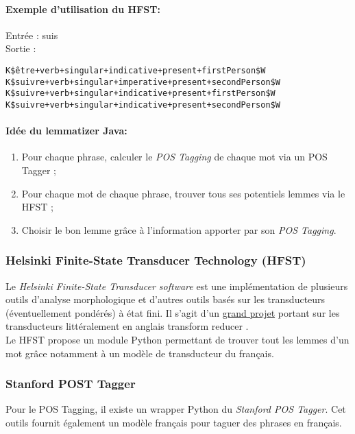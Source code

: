         \paragraph{Exemple d'utilisation du HFST:}
            Entrée : \og suis \fg\\
            Sortie :
\begin{lstlisting}
K$être+verb+singular+indicative+present+firstPerson$W
K$suivre+verb+singular+imperative+present+secondPerson$W
K$suivre+verb+singular+indicative+present+firstPerson$W
K$suivre+verb+singular+indicative+present+secondPerson$W
\end{lstlisting}

        \paragraph{Idée du lemmatizer Java:}
            \begin{enumerate}
                \item Pour chaque phrase, calculer le \textit{POS Tagging} de chaque mot via un POS Tagger ;
                \item Pour chaque mot de chaque phrase, trouver tous ses potentiels lemmes via le HFST ;
                \item Choisir le bon lemme grâce à l'information apporter par son \textit{POS Tagging}.
            \end{enumerate}

        \subsubsection{Helsinki Finite-State Transducer Technology (HFST)}
            Le \textit{Helsinki Finite-State Transducer software} est une implémentation de plusieurs outils d'analyse morphologique et d'autres outils basés sur les transducteurs (éventuellement pondérés) à état fini. Il s'agit d'un \href{http://www.ling.helsinki.fi/kieliteknologia/tutkimus/hfst/}{grand projet} portant sur les transducteurs littéralement en anglais \og transform reducer \fg.\\
            Le HFST propose un module Python permettant de trouver tout les lemmes d'un mot grâce notamment à un modèle de transducteur du français.

        \subsubsection{Stanford POST Tagger}
            Pour le POS Tagging, il existe un wrapper Python du \textit{Stanford POS Tagger}. Cet outils fournit également un modèle français pour taguer des phrases en français.\\

